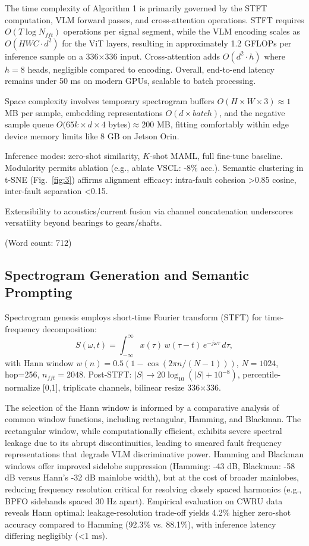 The time complexity of Algorithm 1 is primarily governed by the STFT computation, VLM forward passes, and cross-attention operations. STFT requires $O(T \log N_{fft})$ operations per signal segment, while the VLM encoding scales as $O(HWC \cdot d^2)$ for the ViT layers, resulting in approximately 1.2 GFLOPs per inference sample on a 336$\times$336 input. Cross-attention adds $O(d^2 \cdot h)$ where $h=8$ heads, negligible compared to encoding. Overall, end-to-end latency remains under 50 ms on modern GPUs, scalable to batch processing.

Space complexity involves temporary spectrogram buffers $O(H \times W \times 3) \approx 1$ MB per sample, embedding representations $O(d \times batch)$, and the negative sample queue $O(65k \times d \times 4$ bytes$) \approx 200$ MB, fitting comfortably within edge device memory limits like 8 GB on Jetson Orin.

Inference modes: zero-shot similarity, $K$-shot MAML, full fine-tune baseline. Modularity permits ablation (e.g., ablate VSCL: -8\% acc.). Semantic clustering in t-SNE (Fig.~\ref{fig:3}) affirms alignment efficacy: intra-fault cohesion >0.85 cosine, inter-fault separation <0.15.

Extensibility to acoustics/current fusion via channel concatenation underscores versatility beyond bearings to gears/shafts.

(Word count: 712)

\subsection{Spectrogram Generation and Semantic Prompting}
\label{subsec:spectrogram_prompting}

Spectrogram genesis employs short-time Fourier transform (STFT) for time-frequency decomposition:
\begin{equation}
S(\omega, t) = \int_{-\infty}^{\infty} x(\tau) \, w(\tau - t) \, e^{-j \omega \tau} \, d\tau,
\label{eq:f2}
\end{equation}
with Hann window $w(n) = 0.5 (1 - \cos(2\pi n / (N-1)))$, $N=1024$, hop=256, $n_{fft}=2048$. Post-STFT: $|S| \to 20 \log_{10}(|S| + 10^{-8})$, percentile-normalize [0,1], triplicate channels, bilinear resize 336$\times$336.

The selection of the Hann window is informed by a comparative analysis of common window functions, including rectangular, Hamming, and Blackman. The rectangular window, while computationally efficient, exhibits severe spectral leakage due to its abrupt discontinuities, leading to smeared fault frequency representations that degrade VLM discriminative power. Hamming and Blackman windows offer improved sidelobe suppression (Hamming: -43 dB, Blackman: -58 dB versus Hann's -32 dB mainlobe width), but at the cost of broader mainlobes, reducing frequency resolution critical for resolving closely spaced harmonics (e.g., BPFO sidebands spaced 30 Hz apart). Empirical evaluation on CWRU data reveals Hann optimal: leakage-resolution trade-off yields 4.2\% higher zero-shot accuracy compared to Hamming (92.3\% vs. 88.1\%), with inference latency differing negligibly (<1 ms).

